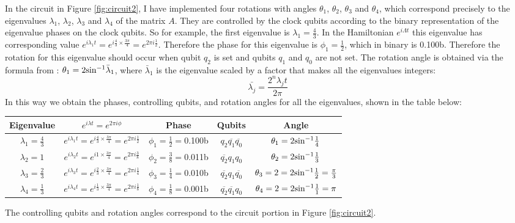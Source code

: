 \documentclass[12pt]{extarticle}
\begin{document}
In the circuit in Figure \ref{fig:circuit2}, I have implemented four rotations with angles $\theta_1$, $\theta_2$, $\theta_3$ and $\theta_4$,
which correspond precisely to the eigenvalues $\lambda_1$, $\lambda_2$, $\lambda_3$ and $\lambda_4$ of the matrix $A$.
They are controlled by the clock qubits according to the binary representation of the eigenvalue phases on the clock qubits.
So for example, the first eigenvalue is $\lambda_1=\frac{4}{3}$.
In the Hamiltonian $e^{i\Lambda t}$ this eigenvalue has corresponding value $e^{i\lambda_1t}=e^{i\frac{4}{3}\times\frac{3\pi}{4}}=e^{2\pi i \frac{1}{2}}$.
Therefore the phase for this eigenvalue is $\phi_1=\frac{1}{2}$, which in binary is 0.100b.
Therefore the rotation for this eigenvalue should occur when qubit $q_2$ is set and qubits $q_1$ and $q_0$ are not set.
The rotation angle is obtained via the formula from \cite{zaman2023step}: $\theta_1=2{{\sin}^{-1}}\bar{\lambda}_1$,
where $\bar{\lambda}_1$ is the eigenvalue scaled by a factor that makes all the eigenvalues integers:
\[
\bar{\lambda_j}=\frac{2^n\lambda_jt}{2\pi}
\]
In this way we obtain the phases, controlling qubits, and rotation angles for all the eigenvalues, shown in the table below:
\begin{center}
\begin{tabular}{|c|c|c|c|c|}
\hline
Eigenvalue & $e^{i\lambda t}=e^{2\pi i\phi}$ & Phase & Qubits & Angle \\
\hline
$\lambda_1=\frac{4}{3}$ & $e^{i\lambda_1t}=e^{i \frac{4}{3} \times \frac{3\pi}{4}}=e^{2\pi i \frac{1}{2}}$ & $\phi_1=\frac{1}{2}=$0.100b & $q_2\overline{q_1}\overline{q_0}$ & $\theta_1=2{{\sin}^{-1}}\frac{1}{4}$ \\
$\lambda_2=1$           & $e^{i\lambda_2t}=e^{i 1 \times \frac{3\pi}{4}}=e^{2\pi i \frac{3}{8}}$   & $\phi_2=\frac{3}{8}=$0.011b & $\overline{q_2}q_1q_0$ & $\theta_2=2{{\sin}^{-1}}\frac{1}{3}$ \\
$\lambda_3=\frac{2}{3}$ & $e^{i\lambda_3t}=e^{i \frac{2}{3} \times \frac{3\pi}{4}}=e^{2\pi i \frac{1}{4}}$ & $\phi_3=\frac{1}{4}=$0.010b & $\overline{q_2}q_1\overline{q_0}$ & $\theta_3=2=2{{\sin}^{-1}}\frac{1}{2}=\frac{\pi}{3}$ \\
$\lambda_4=\frac{1}{3}$ & $e^{i\lambda_4t}=e^{i \frac{1}{3} \times \frac{3\pi}{4}}=e^{2\pi i \frac{1}{8}}$ & $\phi_4=\frac{1}{8}=$0.001b & $\overline{q_2}\overline{q_1}q_0$ & $\theta_4=2=2{{\sin}^{-1}}\frac{1}{1}=\pi$ \\
\hline
\end{tabular}
\end{center}
The controlling qubits and rotation angles correspond to the circuit portion in Figure \ref{fig:circuit2}.
\end{document}
